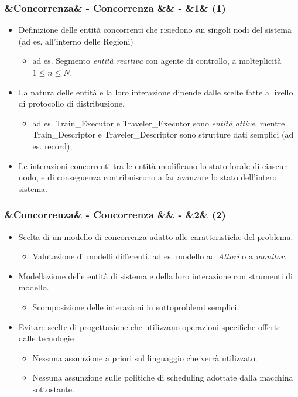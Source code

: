 \documentclass[slidestop,compress,blackandwhite]{beamer}
\newcommand{\ii}[1]{\textit{#1}}
\newcommand{\cm}[1]{\vspace{#1cm}}
\newcommand{\newtitle}[4]{
	#1 
	\ifx&#2&%
	\else
  		\large- #2
	\fi
	\ifx&#3&%
	\else
  		\normalsize- #3
	\fi
	\ifx&#4&%
	\else
  		\normalsize (#4)
	\fi
}
\newcommand{\newframe}[5]{
	\begin{frame}
		\frametitle{\newtitle{#1}{#2}{#3}{#4}}
		#5
	\end{frame}
}
\newcommand{\myitemize}[1]{
	\begin{itemize}\itemsep4pt
	#1
	\end{itemize}
}
\begin{document}
	
	\newframe{}{Concorrenza}{}{1}{
		\justifying
		\cm{0.4}
		\myitemize {
			\item Definizione delle entità concorrenti che risiedono sui singoli nodi del sistema (ad es. all'interno delle Regioni)
			\myitemize{
					\item ad es. Segmento {\em entità reattiva} con agente di controllo, a molteplicità $1\le n\le N$.
				}
			\item La natura delle entità e la loro interazione dipende dalle scelte fatte a livello di protocollo di distribuzione.
				\myitemize {
					\item ad es. Train\_Executor e Traveler\_Executor sono {\em entità attive}, mentre Train\_Descriptor e Traveler\_Descriptor sono strutture dati semplici (ad es. record);
				}	
			\item Le interazioni concorrenti tra le entità  modificano lo stato locale di ciascun nodo, e di conseguenza contribuiscono a far avanzare lo stato dell'intero sistema.
		}
	}
	
	
	\newframe{}{Concorrenza}{}{2}{
		\justifying
		\cm{0.5}
		\myitemize {
			\item Scelta di un modello di concorrenza adatto alle caratteristiche del problema.
				\myitemize{
					\item Valutazione di modelli differenti, ad es. modello ad \ii{Attori} o a \ii{monitor}.
				}
			\item Modellazione delle entità di sistema e della loro interazione con strumenti di modello.
				\myitemize {
					\item Scomposizione delle interazioni in sottoproblemi semplici.
				}
			\item Evitare scelte di progettazione che utilizzano operazioni specifiche offerte dalle tecnologie
				\myitemize {
					\item Nessuna assunzione a priori sul linguaggio che verrà utilizzato.
					\item Nessuna assunzione sulle politiche di scheduling adottate dalla macchina sottostante.
				}
		}
		
	}
	
\end{document}
